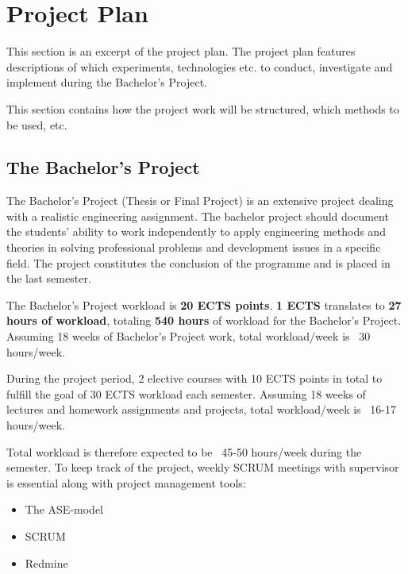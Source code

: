 \chapter{Project Plan}
This section is an excerpt of the project plan. The project plan features descriptions of which experiments, technologies etc. to conduct, investigate and implement during the Bachelor's Project. \newline

This section contains how the project work will be structured, which methods to be used, etc. \newline

\section{The Bachelor's Project}
The Bachelor’s Project (Thesis or Final Project) is an extensive project dealing with a realistic engineering assignment. The bachelor project should document the students’ ability to work independently to apply engineering methods and theories in solving professional problems and development issues in a specific field. The project constitutes the conclusion of the programme and is placed in the last semester. \newline

The Bachelor's Project workload is \textbf{20 ECTS points}. \textbf{1 ECTS} translates to \textbf{27 hours of workload}, totaling \textbf{540 hours} of workload for the Bachelor's Project. Assuming 18 weeks of Bachelor's Project work, total workload/week is ~30 hours/week. \newline

During the project period, 2 elective courses with 10 ECTS points in total to fulfill the goal of 30 ECTS workload each semester. Assuming 18 weeks of lectures and homework assignments and projects, total workload/week is ~16-17 hours/week. \newline

Total workload is therefore expected to be ~45-50 hours/week during the semester. To keep track of the project, weekly SCRUM meetings with supervisor is essential along with project management tools: \\

\begin{itemize}
\item The ASE-model
\item SCRUM
\item Redmine 
\end{itemize}


